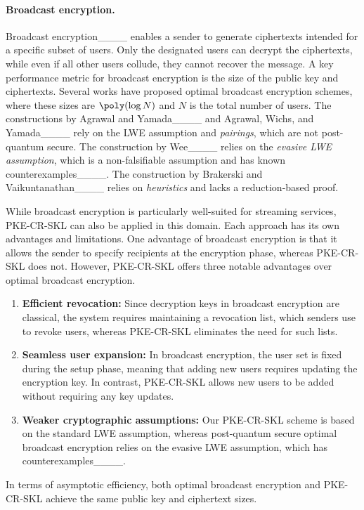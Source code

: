 \paragraph{Broadcast encryption.}
Broadcast encryption____ enables a sender to generate ciphertexts intended for a specific subset of users.
Only the designated users can decrypt the ciphertexts, while even if all other users collude, they cannot recover the message. A key performance metric for broadcast encryption is the size of the public key and ciphertexts.
Several works have proposed optimal broadcast encryption schemes, where these sizes are $\poly(\log{N})$ and $N$ is the total number of users.
The constructions by Agrawal and Yamada____ and Agrawal, Wichs, and Yamada____ rely on the LWE assumption and \emph{pairings}, which are not post-quantum secure. The construction by Wee____ relies on the \emph{evasive LWE assumption}, which is a non-falsifiable assumption and has known counterexamples____. The construction by Brakerski and Vaikuntanathan____ relies on \emph{heuristics} and lacks a reduction-based proof.

While broadcast encryption is particularly well-suited for streaming services, PKE-CR-SKL can also be applied in this domain. Each approach has its own advantages and limitations. One advantage of broadcast encryption is that it allows the sender to specify recipients at the encryption phase, whereas PKE-CR-SKL does not.
However, PKE-CR-SKL offers three notable advantages over optimal broadcast encryption.
\begin{enumerate}
    \item \textbf{Efficient revocation:} Since decryption keys in broadcast encryption are classical, the system requires maintaining a revocation list, which senders use to revoke users, whereas PKE-CR-SKL eliminates the need for such lists.
    \item \textbf{Seamless user expansion:} In broadcast encryption, the user set is fixed during the setup phase, meaning that adding new users requires updating the encryption key. In contrast, PKE-CR-SKL allows new users to be added without requiring any key updates.
    \item \textbf{Weaker cryptographic assumptions:} Our PKE-CR-SKL scheme is based on the standard LWE assumption, whereas post-quantum secure optimal broadcast encryption relies on the evasive LWE assumption, which has counterexamples____.
\end{enumerate}
In terms of  asymptotic efficiency, both optimal broadcast encryption and PKE-CR-SKL achieve the same public key and ciphertext sizes.

